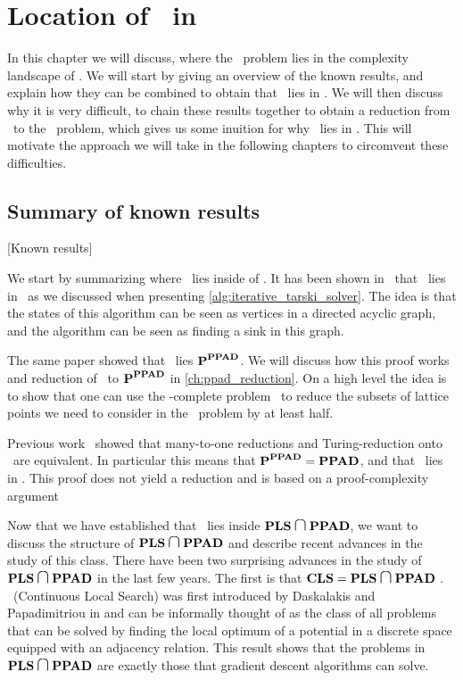 \setchapterpreamble[u]{\margintoc}
\chapter{Location of \Tarski\ in \TFNP}

In this chapter we will discuss, where the \Tarski\ problem lies in the complexity landscape of \TFNP. We will start by giving an overview of the known results, and explain how they can be combined to obtain that \Tarski\ lies in \EOPL. We will then discuss why it is very difficult, to chain these results together to obtain a reduction from \Tarski\ to the \EndOfPotentialLine\ problem, which gives us some inuition for why \Tarski\ lies in \EOPL. This will motivate the approach we will take in the following chapters to circomvent these difficulties.

\section{Summary of known results}[Known results]

We start by summarizing where \Tarski\ lies inside of \TFNP. It has been shown in~\cite{etessami_tarskis_2020} that \Tarski\ lies in \PLS\ as we discussed when presenting \cref{alg:iterative_tarski_solver}. The idea is that the states of this algorithm can be seen as vertices in a directed acyclic graph, and the algorithm can be seen as finding a sink in this graph.

The same paper showed that \Tarski\ lies $\textbf{P}^{\textbf{PPAD}}$. We will discuss how this proof works and reduction of \Tarski\ to $\textbf{P}^{\textbf{PPAD}}$ in \cref{ch:ppad_reduction}. On a high level the idea is to show that one can use the \PPAD-complete problem \Brouwer\ to reduce the subsets of lattice points we need to consider in the \Tarski\ problem by at least half.

Previous work~ showed that many-to-one reductions and Turing-reduction onto \PPAD\ are equivalent. In particular this means that $\textbf{P}^{\textbf{PPAD}} = \textbf{PPAD}$, and that \Tarski\ lies in \PPAD{}. This proof does not yield a reduction and is based on a proof-complexity argument

Now that we have established that \Tarski\ lies inside $\PLS \medcap \PPAD$, we want to discuss the structure of $\PLS \medcap \PPAD$ and describe recent advances in the study of this class. There have been two surprising advances in the study of $\PLS \medcap \PPAD$ in the last few years. The first is that $\CLS = \PLS \medcap \PPAD$ . \CLS\ (Continuous Local Search) was first introduced by Daskalakis and Papadimitriou in  and can be informally thought of as the class of all problems that can be solved by finding the local optimum of a potential in a discrete space equipped with an adjacency relation. This result shows that the problems in $\PLS \medcap \PPAD$ are exactly those that gradient descent algorithms can solve.

